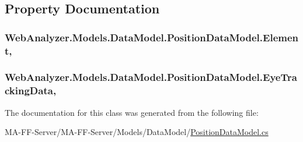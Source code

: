\subsection{Property Documentation}
\hypertarget{class_web_analyzer_1_1_models_1_1_data_model_1_1_position_data_model_a4825afc0a1ecf3eeb0876be8611111ba}{}
\subsubsection[{Element}]{ Web\+Analyzer.\+Models.\+Data\+Model.\+Position\+Data\+Model.\+Element\hspace{0.3cm}{\ttfamily [get]}, {\ttfamily [set]}}\label{class_web_analyzer_1_1_models_1_1_data_model_1_1_position_data_model_a4825afc0a1ecf3eeb0876be8611111ba}
\hypertarget{class_web_analyzer_1_1_models_1_1_data_model_1_1_position_data_model_a06815dcd63aca4dcd91f2d5346f03afd}{}
\subsubsection[{Eye\+Tracking\+Data}]{ Web\+Analyzer.\+Models.\+Data\+Model.\+Position\+Data\+Model.\+Eye\+Tracking\+Data\hspace{0.3cm}{\ttfamily [get]}, {\ttfamily [set]}}\label{class_web_analyzer_1_1_models_1_1_data_model_1_1_position_data_model_a06815dcd63aca4dcd91f2d5346f03afd}


The documentation for this class was generated from the following file\+:\begin{DoxyCompactItemize}
\item 
M\+A-\/\+F\+F-\/\+Server/\+M\+A-\/\+F\+F-\/\+Server/\+Models/\+Data\+Model/\hyperlink{_position_data_model_8cs}{Position\+Data\+Model.\+cs}\end{DoxyCompactItemize}

